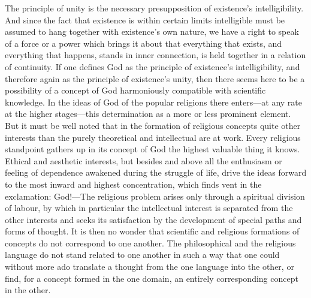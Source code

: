 \documentclass[12pt,a4paper]{book}
\newcommand{\opage}[1]{\marginnote{\footnotesize\textit{[#1]}}}
\begin{document}
The principle of unity is the necessary presupposition of existence's
intelligibility. And since the fact that existence is within certain limits
intelligible must be assumed to hang together with existence's own nature, we
have a right to speak of a force or a power which brings it about that
everything that exists, and everything that happens, stands in inner
connection, is held together in a relation of continuity. If one defines God
as the principle of existence's intelligibility, and therefore again as the
principle of existence's unity, 
\opage{35}then there seems here to be a possibility of a
concept of God harmoniously compatible with scientific knowledge. In the
ideas of God of the popular religions there enters---at any rate at the higher
stages---this determination as a more or less prominent element. But it must
be well noted that in the formation of religious concepts quite other
interests than the purely theoretical and intellectual are at work. Every
religious standpoint gathers up in its concept of God the highest valuable
thing it knows. Ethical and aesthetic interests, but besides and above all the
enthusiasm or feeling of dependence awakened during the struggle of life,
drive the ideas forward to the most inward and highest concentration, which
finds vent in the exclamation: God!---The religious problem arises only
through a spiritual division of labour, by which in particular the
intellectual interest is separated from the other interests and seeks its
satisfaction by the development of special paths and forms of thought.
It is then no wonder that scientific and religious formations of concepts do
not correspond to one another. The philosophical and the religious language do
not stand related to one another in such a way that one could without more ado
translate a thought from the one language into the other, or find, for a
concept formed in the one domain, an entirely corresponding concept in the
other.
\end{document}
